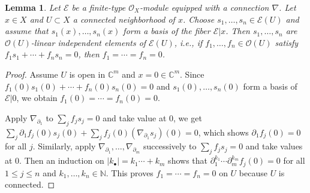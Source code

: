 \documentclass[12pt,b5paper,notitlepage]{report}
\theoremstyle{definition}
\theoremstyle{plain}
\newtheorem{lm}[df]{Lemma}
\newcommand{\id}{\mathbf{1}}
\newcommand{\scr}{\mathscr}
\newcommand{\mbb}{\mathbb}
\newcommand{\blt}{\bullet}
\newcommand{\Cbb}{\mathbb C}
\newcommand{\Nbb}{\mathbb N}
\numberwithin{equation}{section}
\begin{document}






\begin{lm}\label{lb61}
Let $\scr E$ be a finite-type $\scr O_X$-module equipped with a connection $\nabla$. Let $x\in X$ and $U\subset X$ a connected neighborhood of $x$.  Choose $s_1,\dots,s_n\in\scr E(U)$ and assume that $s_1(x),\dots,s_n(x)$ form a basis of the fiber $\scr E|x$. Then $s_1,\dots,s_n$ are $\scr O(U)$-linear independent elements of $\scr E(U)$, i.e., if $f_1,\dots,f_n\in\scr O(U)$ satisfy $f_1s_1+\cdots+f_ns_n=0$, then $f_1=\cdots=f_n=0$.
\end{lm}



\begin{proof}
Assume $U$ is open in $\Cbb^m$ and $x=0\in\Cbb^m$. Since $f_1(0)s_1(0)+\cdots +f_n(0)s_n(0)=0$ and $s_1(0),\dots,s_n(0)$ form a basis of $\scr E|0$, we obtain $f_1(0)=\cdots=f_n(0)=0$.	

Apply $\nabla_{\partial_1}$ to $\sum_j f_js_j=0$ and take value at $0$, we get $\sum_j\partial_1f_j(0)s_j(0)+\sum_j f_j(0)(\nabla_{\partial_1}s_j)(0)=0$, which shows $\partial_1 f_j(0)=0$ for all $j$. Similarly, apply $\nabla_{\partial_1},\dots,\nabla_{\partial_m}$ successively to $\sum_j f_js_j=0$ and take values at $0$. Then an induction on  $|k_\blt|=k_1\cdots+k_m$ shows that $\partial_1^{k_1}\cdots \partial_m^{k_m}f_j(0)=0$ for all $1\leq j\leq n$ and $k_1,\dots,k_n\in\Nbb$. This proves $f_1=\cdots=f_n=0$ on $U$ because $U$ is connected.
\end{proof}



\end{document}
